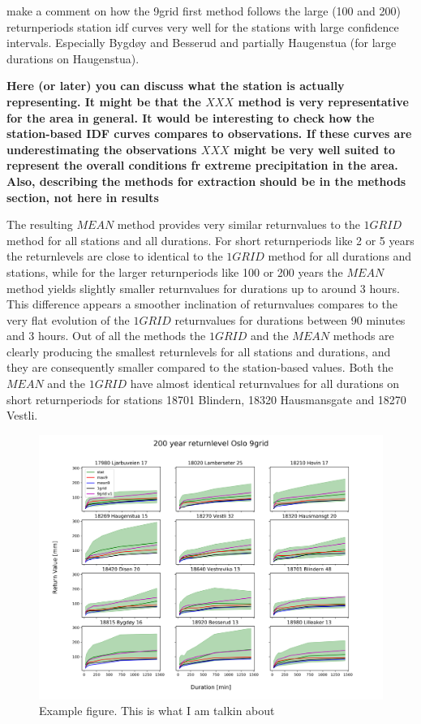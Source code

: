 make a comment on how the 9grid first method follows the large (100 and 200) returnperiods station idf curves very well for the stations with large confidence intervals. Especially Bygdøy and Besserud and partially Haugenstua (for large durations on Haugenstua).


\textbf{Here (or later) you can discuss what the station is actually representing. It might be that the $XXX$ method is very representative for the area in general. It would be interesting to check how the station-based IDF curves compares to observations. If these curves are underestimating the observations $XXX$ might be very well suited to represent the overall conditions fr extreme precipitation in the area. Also, describing the methods for extraction should be in the methods section, not here in results}

The resulting $MEAN$ method provides very similar returnvalues to the $1GRID$ method for all stations and all durations. For short returnperiods like 2 or 5 years the returnlevels are close to identical to the $1GRID$ method for all durations and stations, while for the larger returnperiods like 100 or 200 years the $MEAN$ method yields slightly smaller returnvalues for durations up to around 3 hours. This difference appears a smoother inclination of returnvalues compares to the very flat evolution of the $1GRID$ returnvalues for durations between 90 minutes and 3 hours. Out of all the methods the $1GRID$ and the $MEAN$ methods are clearly producing the smallest returnlevels for all stations and durations, and they are consequently smaller compared to the station-based values. Both the $MEAN$ and the $1GRID$ have almost identical returnvalues for all durations on short returnperiods for stations 18701 Blindern, 18320 Hausmansgate and 18270 Vestli. 

\begin{figure}[hbt!]
    \centering
    \includegraphics[scale=0.4]{figures/200_retper_ECE_1985_compare.png}
    \caption{Example figure. This is what I am talkin about
    \cite{lind_arome}}
    \label{fig:arome_domain}
\end{figure}

